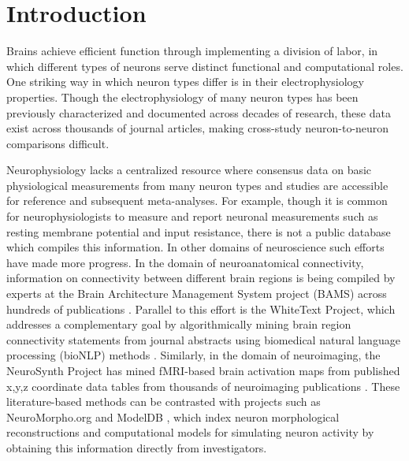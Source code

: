 \documentclass{template/frontiersSCNS} %
\begin{document}
\section{Introduction}

Brains achieve efficient function through implementing a division of labor, in which different types of neurons serve distinct functional and computational roles.  
One striking way in which neuron types differ is in their electrophysiology properties. 
Though the electrophysiology of many neuron types has been previously characterized and documented across decades of research, these data exist across thousands of journal articles, making cross-study neuron-to-neuron comparisons difficult. 

Neurophysiology lacks a centralized resource where consensus data on basic physiological measurements  from many neuron types and studies are accessible for reference and subsequent meta-analyses. 
For example, though it is common for neurophysiologists to measure and report neuronal measurements such as resting membrane potential and input resistance, there is not a public database which compiles this information. 
In other domains of neuroscience such efforts have made more progress.  
In the domain of neuroanatomical connectivity, information on connectivity between different brain regions is being compiled by experts at the Brain Architecture Management System project (BAMS) across hundreds of publications \citep{bota_brain_2005}.  
Parallel to this effort is the WhiteText Project, which addresses a complementary goal by algorithmically mining brain region connectivity statements from journal abstracts using biomedical natural language processing (bioNLP) methods \citep{french_automated_2009,french_application_2012}.  Similarly, in the domain of neuroimaging, the NeuroSynth Project has mined fMRI-based brain activation maps from published {x,y,z} coordinate data tables from thousands of neuroimaging publications \citep{yarkoni_large-scale_2011}.  
These literature-based methods can be contrasted with projects such as NeuroMorpho.org \citep{parekh_neuronal_2013} and ModelDB \citep{migliore_modeldb_2003,hines_modeldb:_2004}, which index neuron morphological reconstructions and computational models for simulating neuron activity by obtaining this information directly from investigators.
\end{document}
